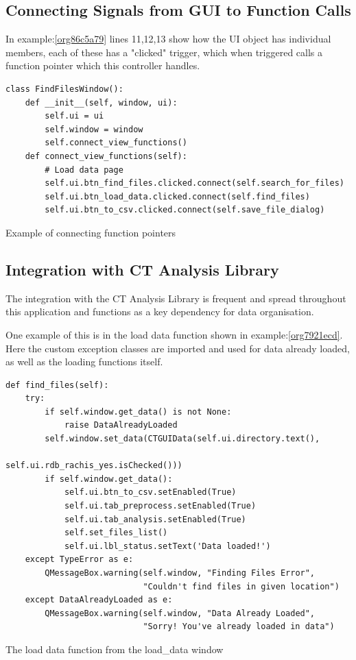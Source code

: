 \documentclass[11pt]{report}
\begin{document}
\subsection{Connecting Signals from GUI to Function Calls}
\label{sec:orgf86a8a8}
In example:\ref{org86c5a79} lines 11,12,13 show how the UI object has individual members, each of these has a "clicked" trigger, which when triggered calls a function pointer which this controller handles.
\begin{listing}[htbp]
\begin{verbatim}
class FindFilesWindow():
    def __init__(self, window, ui):
        self.ui = ui
        self.window = window
        self.connect_view_functions()
    def connect_view_functions(self):
        # Load data page
        self.ui.btn_find_files.clicked.connect(self.search_for_files)
        self.ui.btn_load_data.clicked.connect(self.find_files)
        self.ui.btn_to_csv.clicked.connect(self.save_file_dialog)
\end{verbatim}
\caption{\label{org86c5a79}
Example of connecting function pointers}
\end{listing}

\subsection{Integration with CT Analysis Library}
\label{sec:org130f9c4}

The integration with the CT Analysis Library is frequent and spread throughout this application and functions as a key dependency for data organisation.

One example of this is in the load data function shown in example:\ref{org7921ecd}. Here the custom exception classes are imported and used for data already loaded, as well as the loading functions itself.

\begin{listing}[htbp]
\begin{verbatim}
def find_files(self):
    try:
        if self.window.get_data() is not None:
            raise DataAlreadyLoaded
        self.window.set_data(CTGUIData(self.ui.directory.text(),
                                       self.ui.rdb_rachis_yes.isChecked()))
        if self.window.get_data():
            self.ui.btn_to_csv.setEnabled(True)
            self.ui.tab_preprocess.setEnabled(True)
            self.ui.tab_analysis.setEnabled(True)
            self.set_files_list()
            self.ui.lbl_status.setText('Data loaded!')
    except TypeError as e:
        QMessageBox.warning(self.window, "Finding Files Error",
                            "Couldn't find files in given location")
    except DataAlreadyLoaded as e:
        QMessageBox.warning(self.window, "Data Already Loaded",
                            "Sorry! You've already loaded in data")
\end{verbatim}
\caption{\label{org7921ecd}
The load data function from the load\_data window}
\end{listing}
\end{document}

